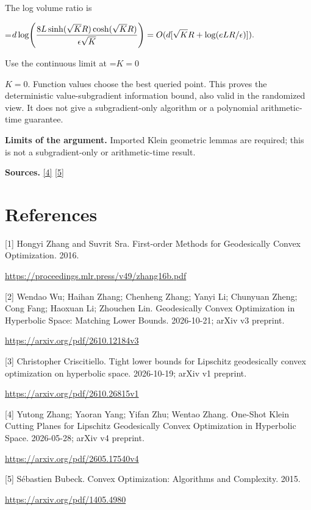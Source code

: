 \documentclass[10pt,a4paper]{article}
\newcommand{\AtlasMath}[1]{\par\begingroup\centering\setbox0=\hbox{$\displaystyle #1$}\ifdim\wd0>1.4\linewidth\typeout{ATLAS WIDE FORMULA: \the\wd0}\fi\ifdim\wd0>\linewidth\resizebox{\linewidth}{!}{\box0}\else\box0\fi\par\endgroup}
\newcommand{\AtlasInlineMath}[1]{\begingroup\setbox0=\hbox{$#1$}\ifdim\wd0>.4\linewidth\endgroup\AtlasMath{#1}\else\endgroup$#1$\fi}
\begin{document}
The log volume ratio is

\AtlasMath{d\log\!\left({8L\sinh(\sqrt KR)\cosh(\sqrt KR)\over\epsilon\sqrt K}\right)
=O(d[\sqrt KR+\log(eLR/\epsilon)]).}

Use the continuous limit at \AtlasInlineMath{K=0}. Function values choose the best queried point. This proves the deterministic value-subgradient information bound, also valid in the randomized view. It does not give a subgradient-only algorithm or a polynomial arithmetic-time guarantee.

\textbf{Limits of the argument.} Imported Klein geometric lemmas are required; this is not a subgradient-only or arithmetic-time result.

\textbf{Sources.} \href{https://arxiv.org/pdf/2605.17540v4}{[4]} \href{https://arxiv.org/pdf/1405.4980}{[5]}

\section{References}
[1] Hongyi Zhang and Suvrit Sra. First-order Methods for Geodesically Convex Optimization. 2016.

\url{https://proceedings.mlr.press/v49/zhang16b.pdf}

[2] Wendao Wu; Haihan Zhang; Chenheng Zhang; Yanyi Li; Chunyuan Zheng; Cong Fang; Haoxuan Li; Zhouchen Lin. Geodesically Convex Optimization in Hyperbolic Space: Matching Lower Bounds. 2026-10-21; arXiv v3 preprint.

\url{https://arxiv.org/pdf/2610.12184v3}

[3] Christopher Criscitiello. Tight lower bounds for Lipschitz geodesically convex optimization on hyperbolic space. 2026-10-19; arXiv v1 preprint.

\url{https://arxiv.org/pdf/2610.26815v1}

[4] Yutong Zhang; Yaoran Yang; Yifan Zhu; Wentao Zhang. One-Shot Klein Cutting Planes for Lipschitz Geodesically Convex Optimization in Hyperbolic Space. 2026-05-28; arXiv v4 preprint.

\url{https://arxiv.org/pdf/2605.17540v4}

[5] Sébastien Bubeck. Convex Optimization: Algorithms and Complexity. 2015.

\url{https://arxiv.org/pdf/1405.4980}
\end{document}
